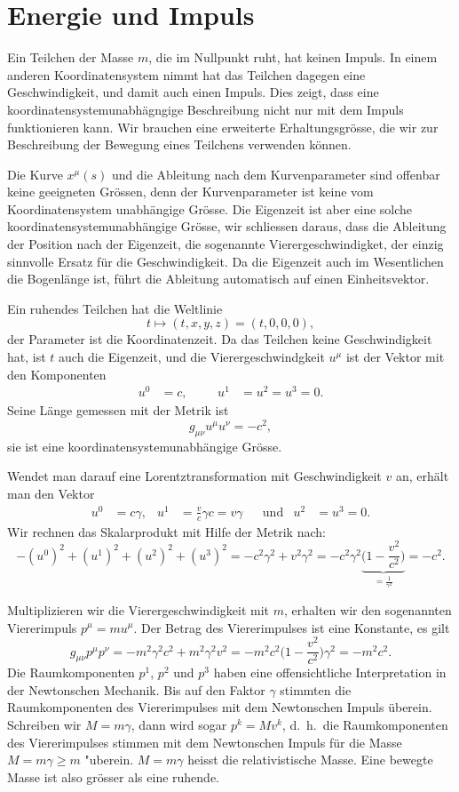 \section{Energie und Impuls}
Ein Teilchen der Masse $m$, die im Nullpunkt ruht, hat keinen
Impuls.
In einem anderen Koordinatensystem nimmt hat das Teilchen dagegen
eine Geschwindigkeit, und damit auch einen Impuls.
Dies zeigt, dass eine koordinatensystemunabhägngige Beschreibung
nicht nur mit dem Impuls funktionieren kann.
Wir brauchen eine erweiterte Erhaltungsgrösse, die wir zur Beschreibung
der Bewegung eines Teilchens verwenden können.

Die Kurve $x^\mu(s)$ und die Ableitung nach dem Kurvenparameter sind
offenbar keine geeigneten Grössen, denn der Kurvenparameter ist
keine vom Koordinatensystem unabhängige Grösse.
Die Eigenzeit ist aber eine solche koordinatensystemunabhängige
Grösse, wir schliessen daraus, dass die Ableitung der Position
nach der Eigenzeit, die sogenannte Vierergeschwindigket, der einzig
sinnvolle Ersatz für die Geschwindigkeit.
Da die Eigenzeit auch im Wesentlichen die Bogenlänge ist, führt die
Ableitung automatisch auf einen Einheitsvektor.

Ein ruhendes Teilchen hat die Weltlinie
\[
t\mapsto (t, x, y, z)=(t,0,0,0),
\]
der Parameter ist die Koordinatenzeit.
Da das Teilchen keine Geschwindigkeit hat, ist $t$ auch die Eigenzeit,
und die Vierergeschwindgkeit $u^\mu$ ist der Vektor mit den
Komponenten
\[
\begin{aligned}
u^0 &= c,
&&&
u^1&=u^2=u^3 = 0.
\end{aligned}
\]
Seine Länge gemessen mit der Metrik ist
\[
g_{\mu\nu}u^\mu u^\nu=-c^2,
\]
sie ist eine koordinatensystemunabhängige Grösse.

Wendet man darauf eine Lorentztransformation mit Geschwindigkeit $v$ an,
erhält man den Vektor
\[
\begin{aligned}
u^0
&=
c\gamma,
&
u^1
&=
\frac{v}{c}\gamma c
=v\gamma
&&\text{und}
&
u^2&=u^3=0.
\end{aligned}
\]
Wir rechnen das Skalarprodukt mit Hilfe der Metrik nach:
\[
-(u^0)^2 + (u^1)^2 + (u^2)^2 + (u^3)^2
=
-c^2\gamma^2 + v^2\gamma^2
=
-c^2\gamma^2
\underbrace{\biggl(1-\frac{v^2}{c^2}\biggr)}_{\displaystyle=\frac{1}{\gamma^2}}
=
-c^2.
\]

Multiplizieren wir die Vierergeschwindigkeit mit $m$, erhalten wir
den sogenannten Viererimpuls $p^\mu = mu^\mu$.
Der Betrag des Viererimpulses ist eine Konstante, es gilt
\[
g_{\mu\nu}p^\mu p^\nu
=
-
m^2\gamma^2 c^2
+
m^2 \gamma^2 v^2
=
-m^2c^2\biggl(\displaystyle 1-\frac{v^2}{c^2}\biggr)\gamma^2
=
-m^2c^2.
\]
Die Raumkomponenten $p^1$, $p^2$ und $p^3$ haben eine offensichtliche
Interpretation in der Newtonschen Mechanik.
Bis auf den Faktor $\gamma$ stimmten die Raumkomponenten des Viererimpulses
mit dem Newtonschen Impuls überein.
Schreiben wir $M=m\gamma$, dann wird sogar $p^k = M v^k$, d.~h.~die
Raumkomponenten des Viererimpulses stimmen mit dem Newtonschen Impuls 
für die Masse $M=m\gamma  \ge m$ "uberein.
$M=m\gamma$ heisst die relativistische Masse.
Eine bewegte Masse ist also grösser als eine ruhende.

